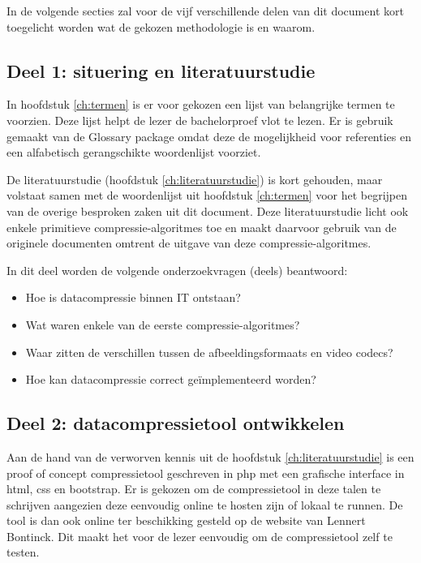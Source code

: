 In de volgende secties zal voor de vijf verschillende delen van dit document kort toegelicht worden wat de gekozen methodologie is en waarom.

\subsection{Deel 1: situering en literatuurstudie}
\label{sec:aanpak-bachelorproef-deel-1}

In hoofdstuk \ref{ch:termen} is er voor gekozen een lijst van belangrijke termen te voorzien. Deze lijst helpt de lezer de bachelorproef vlot te lezen. Er is gebruik gemaakt van de Glossary package omdat deze de mogelijkheid voor referenties en een alfabetisch gerangschikte woordenlijst voorziet.

De literatuurstudie (hoofdstuk \ref{ch:literatuurstudie}) is kort gehouden, maar volstaat samen met de woordenlijst uit hoofdstuk \ref{ch:termen} voor het begrijpen van de overige besproken zaken uit dit document. Deze literatuurstudie licht ook enkele primitieve \glspl{compressie-algoritme} toe en maakt daarvoor gebruik van de originele documenten omtrent de uitgave van deze \glspl{compressie-algoritme}. 

In dit deel worden de volgende onderzoekvragen (deels) beantwoord: 
\begin{itemize}
	\item Hoe is \gls{datacompressie} binnen IT ontstaan?
	\item Wat waren enkele van de eerste \glspl{compressie-algoritme}?
	\item Waar zitten de verschillen tussen de \glspl{afbeeldingsformaat} en video \glspl{codec}?
	\item Hoe kan \gls{datacompressie} correct geïmplementeerd worden?
\end{itemize}

\subsection{Deel 2: datacompressietool ontwikkelen}
\label{sec:aanpak-bachelorproef-deel-2}

Aan de hand van de verworven kennis uit de hoofdstuk \ref{ch:literatuurstudie} is een proof of concept \gls{compressietool} geschreven in \gls{php} met een grafische interface in \gls{html}, \gls{css} en \gls{bootstrap}. Er is gekozen om de \gls{compressietool} in deze talen te schrijven aangezien deze eenvoudig online te hosten zijn of lokaal te runnen. De tool is dan ook online ter beschikking gesteld op de website van Lennert Bontinck. Dit maakt het voor de lezer eenvoudig om de \gls{compressietool} zelf te testen.

